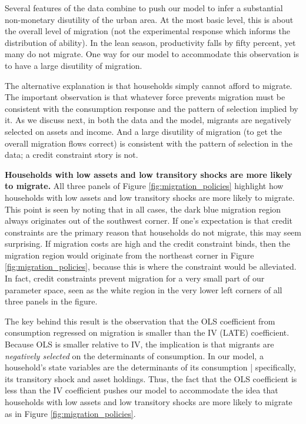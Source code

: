 \documentclass[12pt,pdftex]{article}
\begin{document}
Several features of the data combine to push our model to infer a substantial non-monetary disutility of the urban area. At the most basic level, this is about the overall level of migration (not the experimental response which informs the distribution of ability). In the lean season, productivity falls by fifty percent, yet many do not migrate. One way for our model to accommodate this observation is to have a large disutility of migration.

The alternative explanation is that households simply cannot afford to migrate. The important observation is that whatever force prevents migration must be consistent with the consumption response and the pattern of selection implied by it. As we discuss next, in both the data and the model, migrants are negatively selected on assets and income. And a large disutility of migration (to get the overall migration flows correct) is consistent with the pattern of selection in the data; a credit constraint story is not.

\textbf{Households with low assets and low transitory shocks are more likely to migrate.} All three panels of Figure \ref{fig:migration_policies} highlight how households with low assets and low transitory shocks are more likely to migrate. This point is seen by noting that in all cases, the dark blue migration region always originates out of the southwest corner. If one's expectation is that credit constraints are the primary reason that households do not migrate, this may seem surprising. If migration costs are high and the credit constraint binds, then the migration region would originate from the northeast corner in Figure \ref{fig:migration_policies}, because this is where the constraint would be alleviated. In fact, credit constraints prevent migration for a very small part of our parameter space, seen as the white region in the very lower left corners of all three panels in the figure.

The key behind this result is the observation that the OLS coefficient from consumption regressed on migration is smaller than the IV (LATE) coefficient. Because OLS is smaller relative to IV, the implication is that migrants are \emph{negatively selected} on the determinants of consumption. In our model, a household's state variables are the determinants of its consumption | specifically, its transitory shock and asset holdings. Thus, the fact that the OLS coefficient is less than the IV coefficient pushes our model to accommodate the idea that households with low assets and low transitory shocks are more likely to migrate as in Figure \ref{fig:migration_policies}.
\end{document}

